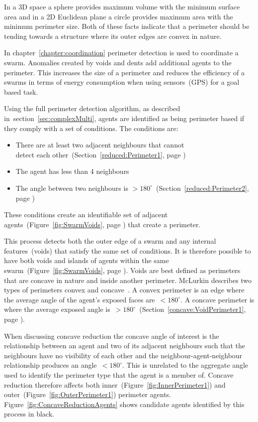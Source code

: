 In a 3D space a sphere provides maximum volume with the minimum surface area and in a 2D Euclidean plane a circle provides maximum area with the minimum perimeter size. Both of these facts indicate that a perimeter should be tending towards a structure where its outer edges are convex in nature. 

In chapter~\ref{chapter:coordination} perimeter detection is used to coordinate a swarm. Anomalies created by voids and dents add additional agents to the perimeter. This increases the size of a perimeter and reduces the efficiency of a swarms in terms of energy consumption when using sensors~(GPS) for a goal based task. 
 
Using the full perimeter detection algorithm, as described in~section~\ref{sec:complexMulti}, agents are identified as being perimeter based if they comply with a set of conditions. The conditions are: 
\begin{itemize}
  \item There are at least two adjacent neighbours that cannot\\detect each other~(Section~\ref{reduced:Perimeter1}, page \pageref{reduced:Perimeter1})
  \item The agent has less than 4 neighbours
  \item The angle between two neighbours is $> 180^\circ$~(Section~\ref{reduced:Perimeter2}, page \pageref{reduced:Perimeter2})
\end{itemize} 
These conditions create an identifiable set of adjacent agents~(Figure~\ref{fig:SwarmVoids}, page \pageref{fig:SwarmVoids}) that create a perimeter.

This process detects both the outer edge of a swarm and any internal features~(voids) that satisfy the same set of conditions. It is therefore possible to have both voids and islands of agents within the same swarm~(Figure~\ref{fig:SwarmVoids}, page \pageref{fig:SwarmVoids}). Voids are best defined as perimeters that are concave in nature and inside another perimeter. McLurkin describes two types of perimeters convex and concave~\cite{MD:09}. A convex perimeter is an edge where the average angle of the agent's exposed faces are~$< 180^\circ$. A concave perimeter is where the average exposed angle is~$> 180^\circ$~(Section~\ref{concave:VoidPerimeter1}, page \pageref{concave:VoidPerimeter1}).
 
When discussing concave reduction the concave angle of interest is the relationship between an agent and two of its adjacent neighbours such that the neighbours have no visibility of each other and the neighbour-agent-neighbour relationship produces an angle~$< 180^\circ$. This is unrelated to the aggregate angle used to identify the perimeter type that the agent is a member of. Concave reduction therefore affects both inner~(Figure~\ref{fig:InnerPerimeter1}) and outer~(Figure~\ref{fig:OuterPerimeter1}) perimeter agents. Figure~\ref{fig:ConcaveReductionAgents} shows candidate agents identified by this process in black. 


